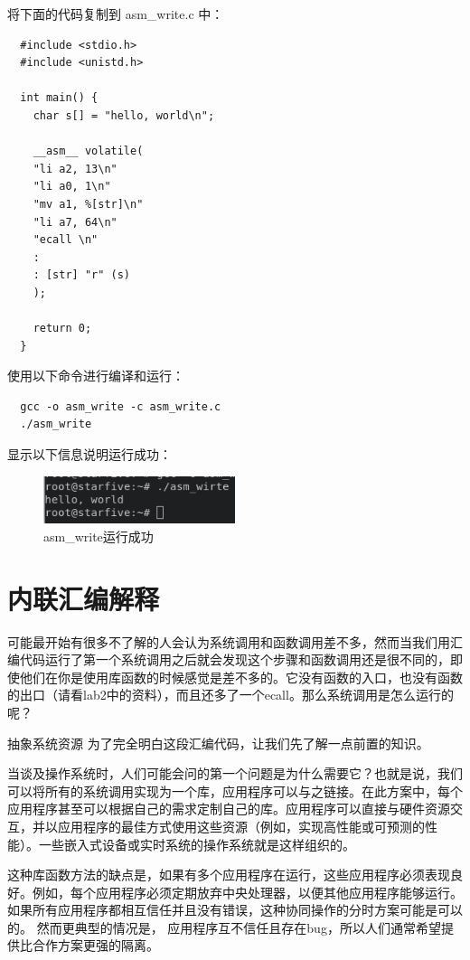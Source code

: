 \documentclass[lang=cn,10pt]{elegantbook}
\begin{document}
将下面的代码复制到 asm\_write.c 中：

\begin{lstlisting}
  #include <stdio.h>
  #include <unistd.h>

  int main() {
    char s[] = "hello, world\n";

    __asm__ volatile(
    "li a2, 13\n"
    "li a0, 1\n"
    "mv a1, %[str]\n"
    "li a7, 64\n"	
    "ecall \n"
    :
    : [str] "r" (s)	
    );

    return 0;
  }
\end{lstlisting}

使用以下命令进行编译和运行：

\begin{lstlisting}
  gcc -o asm_write -c asm_write.c
  ./asm_write
\end{lstlisting}

显示以下信息说明运行成功：
\begin{figure}[htbp]
  \centering
  \includegraphics[width=0.5\textwidth]{image/image-20231105134323745.png}
  \caption{asm\_write运行成功}
\end{figure}

\section{内联汇编解释}
可能最开始有很多不了解的人会认为系统调用和函数调用差不多，然而当我们用汇编代码运行了第一个系统调用之后就会发现这个步骤和函数调用还是很不同的，即使他们在你是使用库函数的时候感觉是差不多的。它没有函数的入口，也没有函数的出口（请看lab2中的资料），而且还多了一个ecall。那么系统调用是怎么运行的呢？

抽象系统资源
为了完全明白这段汇编代码，让我们先了解一点前置的知识。

当谈及操作系统时，人们可能会问的第一个问题是为什么需要它？也就是说，我们可以将所有的系统调用实现为一个库，应用程序可以与之链接。在此方案中，每个应用程序甚至可以根据自己的需求定制自己的库。应用程序可以直接与硬件资源交互，并以应用程序的最佳方式使用这些资源（例如，实现高性能或可预测的性能）。一些嵌入式设备或实时系统的操作系统就是这样组织的。

这种库函数方法的缺点是，如果有多个应用程序在运行，这些应用程序必须表现良好。例如，每个应用程序必须定期放弃中央处理器，以便其他应用程序能够运行。如果所有应用程序都相互信任并且没有错误，这种协同操作的分时方案可能是可以的。 然而更典型的情况是， 应用程序互不信任且存在bug，所以人们通常希望提供比合作方案更强的隔离。
\end{document}
